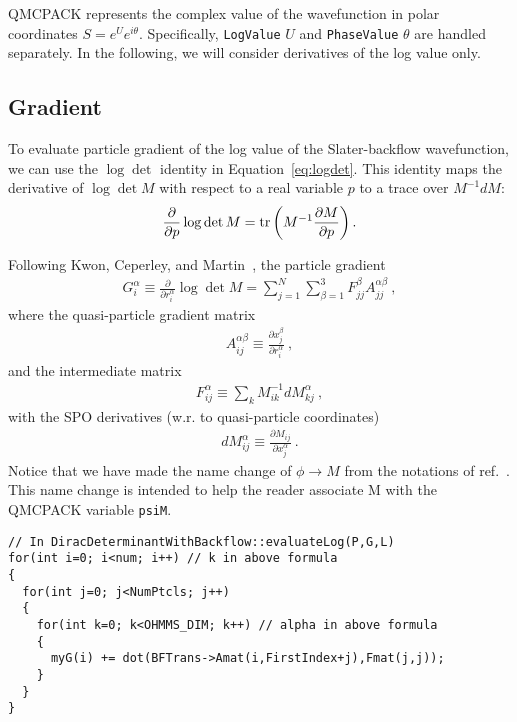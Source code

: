 QMCPACK represents the complex value of the wavefunction in polar coordinates $S=e^Ue^{i\theta}$. Specifically, \verb|LogValue| $U$ and \verb|PhaseValue| $\theta$ are handled separately. In the following, we will consider derivatives of the log value only.

\subsection{Gradient}
To evaluate particle gradient of the log value of the Slater-backflow wavefunction, we can use the $\log\det$ identity in Equation~\ref{eq:logdet}. This identity maps the derivative of $\log\det M$ with respect to a real variable $p$ to a trace over $M^{-1}dM$:
\begin{align}
\frac{\partial}{\partial p}\log\det M = \text{tr}\left( M^{-1} \frac{\partial M}{\partial p} \right) \label{eq:logdet}.
\end{align}

Following Kwon, Ceperley, and Martin~\cite{Kwon1993backflow}, the particle gradient
\begin{align}
G_i^\alpha \equiv \frac{\partial}{\partial r_i^\alpha} \log\det M = \sum\limits_{j=1}^N \sum\limits_{\beta=1}^3 F_{jj}^\beta A_{jj}^{\alpha\beta}\:, \label{eq:grad}
\end{align}
where the quasi-particle gradient matrix
\begin{align}
A_{ij}^{\alpha\beta} \equiv \frac{\partial x_j^\beta}{\partial r_i^\alpha}\:,
\end{align}
and the intermediate matrix
\begin{align}
F_{ij}^\alpha\equiv\sum\limits_k M^{-1}_{ik} dM_{kj}^\alpha\:,
\end{align}
with the SPO derivatives (w.r. to quasi-particle coordinates)
\begin{align}
dM_{ij}^\alpha \equiv \frac{\partial M_{ij}}{\partial x_j^\alpha}\:.
\end{align}
Notice that we have made the name change of $\phi\rightarrow M$ from the notations of ref.~\cite{Kwon1993backflow}. This name change is intended to help the reader associate M with the QMCPACK variable \verb|psiM|.
\begin{lstlisting}
// In DiracDeterminantWithBackflow::evaluateLog(P,G,L)
for(int i=0; i<num; i++) // k in above formula
{
  for(int j=0; j<NumPtcls; j++)
  {
    for(int k=0; k<OHMMS_DIM; k++) // alpha in above formula
    {
      myG(i) += dot(BFTrans->Amat(i,FirstIndex+j),Fmat(j,j));
    }
  }
}
\end{lstlisting}

